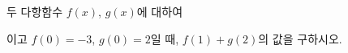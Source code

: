 두 다항함수 $f(x)$, $g(x)$에 대하여 \par\smallskip{}\par\smallskip{}\par\smallskip\noindent 이고 $f(0)=-3$, $g(0)=2$일 때, $f(1)+g(2)$의 값을 구하시오.
